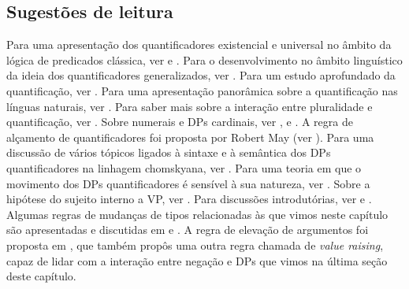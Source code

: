 \begin{tcolorbox}[parbox=false,boxrule=0pt,sharp corners,breakable]

\section*{Sugestões de leitura}

\n Para uma apresentação dos quantificadores existencial e universal no âmbito da lógica de predicados clássica, ver \cite{gamut91} e \cite{mortari16}. Para o desenvolvimento no âmbito linguístico da ideia dos quantificadores generalizados, ver \cite{barcoo81}. Para um estudo aprofundado da quantificação, ver \cite{petwes08}. 
Para uma apresentação panorâmica sobre a quantificação nas línguas naturais, ver \cite{szabolcsi10}.
Para saber mais sobre a interação entre pluralidade e quantificação, ver \cite{winter01}. Sobre numerais e DPs cardinais, ver \cite{geurts06}, \cite{geunou07} e \cite{krifka99}. A regra de alçamento de quantificadores foi proposta por Robert May (ver \cite{may77,may85}). Para uma discussão de vários tópicos ligados à sintaxe e à semântica  dos DPs quantificadores na linhagem chomskyana, ver \cite{hornstein94}. Para uma teoria em que o movimento dos DPs quantificadores é sensível à sua natureza, ver \cite{begsto97}. Sobre a hipótese do sujeito interno a VP, ver \cite{koospo91}.  Para discussões introdutórias, ver \cite{carnie13} e \cite{haegeman94}. Algumas regras de mudanças de tipos relacionadas às que vimos neste capítulo são apresentadas e discutidas em \cite{partee86} e \cite{parroo83}. A regra de elevação de argumentos foi proposta em \cite{hendriks93}, que também propôs uma outra regra chamada de \textit{value raising}, capaz de lidar com a interação entre negação e DPs que vimos na última seção deste capítulo.

\end{tcolorbox}

\bigskip


